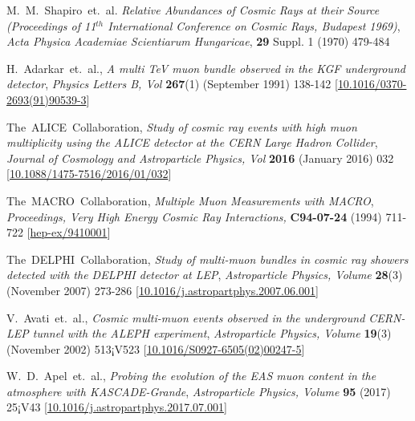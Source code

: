 \documentclass[a4paper,12pt,twoside,openany]{article}
\begin{document}
\begin{thebibliography}{9}
  M.~M.~Shapiro~et.~al. \emph{Relative Abundances of Cosmic Rays at their Source (Proceedings of 11$^{th}$ International Conference on Cosmic Rays, Budapest 1969)}, \emph{Acta Physica Academiae Scientiarum Hungaricae}, \textbf{29} Suppl. 1 (1970) 479-484 

  H.~Adarkar~et.~al., \emph{A multi TeV muon bundle observed in the KGF underground detector}, \emph{Physics Letters B, Vol} \textbf{267}(1) (September 1991) 138-142 [\href{https://doi.org/10.1016/0370-2693(91)90539-3}{10.1016/0370-2693(91)90539-3}]

  The~ALICE~Collaboration, \emph{Study of cosmic ray events with high muon multiplicity using the ALICE detector at the CERN Large Hadron Collider}, \emph{Journal of Cosmology and Astroparticle Physics, Vol} \textbf{2016} (January 2016) 032 [\href{https://doi.org/10.1088/1475-7516/2016/01/032}{10.1088/1475-7516/2016/01/032}]

  The~MACRO~Collaboration, \emph{Multiple Muon Measurements with MACRO}, \emph{Proceedings, Very High Energy Cosmic Ray Interactions,} \textbf{C94-07-24} (1994) 711-722 [\href{https://arxiv.org/abs/hep-ex/9410001}{hep-ex/9410001}]

  The~DELPHI~Collaboration, \emph{Study of multi-muon bundles in cosmic ray showers detected with the DELPHI detector at LEP}, \emph{Astroparticle Physics, Volume }\textbf{28}(3) (November 2007) 273-286 [\href{https://doi.org/10.1016/j.astropartphys.2007.06.001}{10.1016/j.astropartphys.2007.06.001}]

  V.~Avati~et.~al., \emph{Cosmic multi-muon events observed in the underground CERN-LEP tunnel with the ALEPH experiment}, \emph{Astroparticle Physics, Volume }\textbf{19}(3) (November 2002) 513¡V523 [\href{https://doi.org/10.1016/S0927-6505(02)00247-5}{10.1016/S0927-6505(02)00247-5}]

  W.~D.~Apel~et.~al., \emph{Probing the evolution of the EAS muon content in the atmosphere with KASCADE-Grande}, \emph{Astroparticle Physics, Volume }\textbf{95} (2017) 25¡V43 [\href{https://doi.org/10.1016/j.astropartphys.2017.07.001}{10.1016/j.astropartphys.2017.07.001}]

\end{thebibliography}




\end{document}
